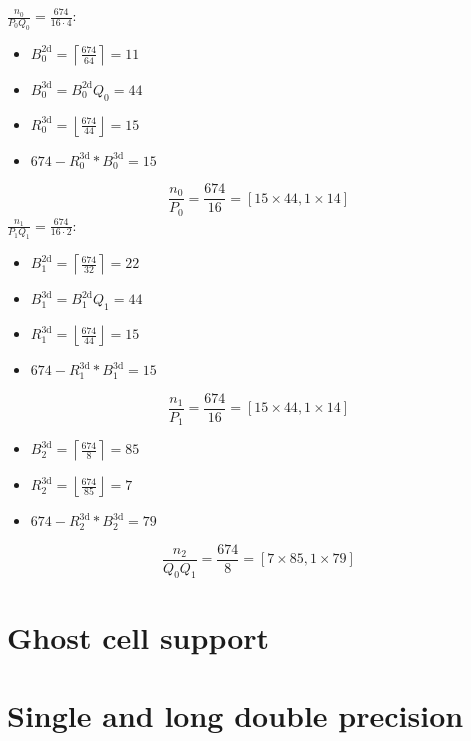 $\frac{n_0}{P_0Q_0} = \frac{674}{16\cdot 4}$:
\begin{itemize}
 \item $B_0^\textrm{2d} = \left\lceil \frac{674}{64} \right\rceil = 11$
 \item $B_0^\textrm{3d} = B_0^\textrm{2d}Q_0 = 44$
 \item $R_0^\textrm{3d} = \left\lfloor \frac{674}{44} \right\rfloor = 15$
 \item $674 - R_0^\textrm{3d}*B_0^\textrm{3d} = 15$
\end{itemize}
\begin{equation*}
  \frac{n_0}{P_0} = \frac{674}{16} = \left[15\times 44, 1\times 14 \right]
\end{equation*}
$\frac{n_1}{P_1Q_1} = \frac{674}{16\cdot 2}$:
\begin{itemize}
 \item $B_1^\textrm{2d} = \left\lceil \frac{674}{32} \right\rceil = 22$
 \item $B_1^\textrm{3d} = B_1^\textrm{2d}Q_1 = 44$
 \item $R_1^\textrm{3d} = \left\lfloor \frac{674}{44} \right\rfloor = 15$
 \item $674 - R_1^\textrm{3d}*B_1^\textrm{3d} = 15$
\end{itemize}
\begin{equation*}
  \frac{n_1}{P_1} = \frac{674}{16} = \left[15\times 44, 1\times 14 \right]
\end{equation*}

\begin{itemize}
 \item $B_2^\textrm{3d} = \left\lceil \frac{674}{8} \right\rceil = 85$
 \item $R_2^\textrm{3d} = \left\lfloor \frac{674}{85} \right\rfloor = 7$
 \item $674 - R_2^\textrm{3d}*B_2^\textrm{3d} = 79$
\end{itemize}
\begin{equation*}
  \frac{n_2}{Q_0Q_1} = \frac{674}{8} = \left[7\times 85, 1\times 79 \right]
\end{equation*}

\section{Ghost cell support}


\section{Single and long double precision}
